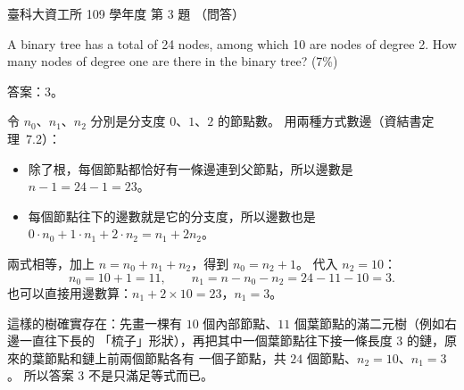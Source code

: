 \begin{pastexam}[label={px:ntust-109-ice-03}]{臺科大資工所 109 學年度 第 3 題}
（問答）

A binary tree has a total of 24 nodes, among which 10 are nodes of degree 2. How many nodes of
degree one are there in the binary tree? (7\%)
\end{pastexam}

\begin{pastsoln}
答案：$3$。

令 $n_0$、$n_1$、$n_2$ 分別是分支度 $0$、$1$、$2$ 的節點數。 用兩種方式數邊（資結書定理~7.2）：
\begin{itemize}
\item 除了根，每個節點都恰好有一條邊連到父節點，所以邊數是 $n - 1 = 24 - 1 = 23$。
\item 每個節點往下的邊數就是它的分支度，所以邊數也是 $0 \cdot n_0 + 1 \cdot n_1 + 2 \cdot n_2
= n_1 + 2n_2$。
\end{itemize}
兩式相等，加上 $n = n_0 + n_1 + n_2$，得到 $n_0 = n_2 + 1$。 代入 $n_2 = 10$：
\[
n_0 = 10 + 1 = 11, \qquad n_1 = n - n_0 - n_2 = 24 - 11 - 10 = 3.
\]
也可以直接用邊數算：$n_1 + 2 \times 10 = 23$，$n_1 = 3$。

這樣的樹確實存在：先畫一棵有 $10$ 個內部節點、$11$ 個葉節點的滿二元樹（例如右邊一直往下長的
「梳子」形狀），再把其中一個葉節點往下接一條長度 $3$ 的鏈，原來的葉節點和鏈上前兩個節點各有
一個子節點，共 $24$ 個節點、$n_2 = 10$、$n_1 = 3$。 所以答案 $3$ 不是只滿足等式而已。
\end{pastsoln}
